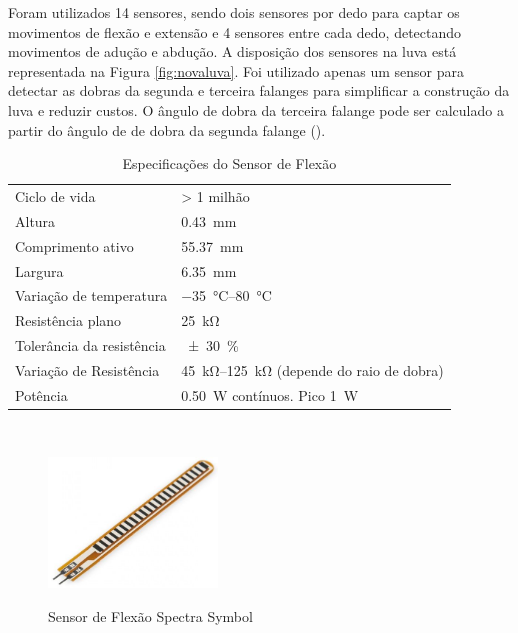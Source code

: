 Foram utilizados 14 sensores, sendo dois sensores por dedo para captar os movimentos de flexão e extensão e 4 sensores entre cada dedo, detectando movimentos de adução e abdução. A disposição dos sensores na luva está representada na Figura \ref{fig:novaluva}. Foi utilizado apenas um sensor para detectar as dobras da segunda e terceira falanges para simplificar a construção da luva e reduzir custos. O ângulo de dobra da terceira falange pode ser calculado a partir do ângulo de de dobra da segunda falange (\cite{li2009smartglove}).

\begin{table}[H]
  \centering
  \footnotesize
  \setlength{\abovecaptionskip}{0pt}
  \setlength{\belowcaptionskip}{0pt}
  \caption[Especificações do Sensor de Flexão]{Especificações do Sensor de Flexão}
  \label{tab:flexspec}
  \begin{tabular}{l l}
    \hline\hline
    Ciclo de vida             & > 1 milhão \\
    Altura                    & \SI{0.43}{\mm} \\
    Comprimento ativo         & \SI{55.37}{\mm} \\
    Largura                   & \SI{6.35}{\mm} \\
    Variação de temperatura   & \SIrange{-35}{+80}{\degreeCelsius} \\
    Resistência plano         & \SI{25}{\kilo\ohm} \\
    Tolerância da resistência & \SI{+-30}{\percent} \\
    Variação de Resistência   & \SIrange{45}{125}{\kilo\ohm} (depende do raio de dobra) \\
    Potência                  & \SI{0.50}{\watt} contínuos. Pico \SI{1}{\watt} \\
    \hline\hline
  \end{tabular}
  \\\vspace{1.3mm}
\end{table}

\begin{figure}[H]
  \setlength{\abovecaptionskip}{0pt}
  \setlength{\belowcaptionskip}{0pt}
  \caption[Sensor de Flexão Spectra Symbol]{Sensor de Flexão Spectra Symbol}
  \centering
  \includegraphics[width=0.4\textwidth]{imagem/spectraFlex}
  \captionsetup{justification=centering}
  \label{fig:spectraflex}
\end{figure}


